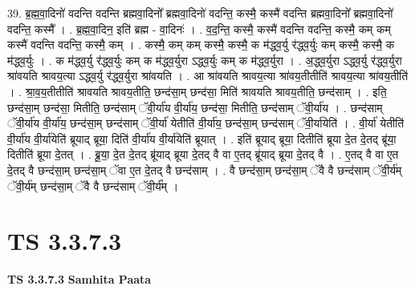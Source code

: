 \documentclass[17pt]{extarticle}
\begin{document}
39. ब्र॒ह्म॒वा॒दिनो॑ वदन्ति वदन्ति ब्रह्मवा॒दिनो᳚ ब्रह्मवा॒दिनो॑ वदन्ति॒ कस्मै॒ कस्मै॑ वदन्ति ब्रह्मवा॒दिनो᳚ ब्रह्मवा॒दिनो॑ वदन्ति॒ कस्मै᳚ । . ब्र॒ह्म॒वा॒दिन॒ इति॑ ब्रह्म - वा॒दिनः॑ । . व॒द॒न्ति॒ कस्मै॒ कस्मै॑ वदन्ति वदन्ति॒ कस्मै॒ कम् कम् कस्मै॑ वदन्ति वदन्ति॒ कस्मै॒ कम् । . कस्मै॒ कम् कम् कस्मै॒ कस्मै॒ क म॑द्ध्व॒र्यु र॑द्ध्व॒र्युः कम् कस्मै॒ कस्मै॒ क म॑द्ध्व॒र्युः । . क म॑द्ध्व॒र्यु र॑द्ध्व॒र्युः कम् क म॑द्ध्व॒र्युरा ऽद्ध्व॒र्युः कम् क म॑द्ध्व॒र्युरा । . अ॒द्ध्व॒र्युरा ऽद्ध्व॒र्यु र॑द्ध्व॒र्युरा श्रा॑वयति श्रावय॒त्या ऽद्ध्व॒र्यु र॑द्ध्व॒र्युरा श्रा॑वयति । . आ श्रा॑वयति श्रावय॒त्या श्रा॑वय॒तीतीति॑ श्रावय॒त्या श्रा॑वय॒तीति॑ । . श्रा॒व॒य॒तीतीति॑ श्रावयति श्रावय॒तीति॒ छन्द॑सा॒म् छन्द॑सा॒ मिति॑ श्रावयति श्रावय॒तीति॒ छन्द॑साम् । . इति॒ छन्द॑सा॒म् छन्द॑सा॒ मितीति॒ छन्द॑साम् ॅवी॒र्या॑य वी॒र्या॑य॒ छन्द॑सा॒ मितीति॒ छन्द॑साम् ॅवी॒र्या॑य । . छन्द॑साम् ॅवी॒र्या॑य वी॒र्या॑य॒ छन्द॑सा॒म् छन्द॑साम् ॅवी॒र्या॑ येतीति॑ वी॒र्या॑य॒ छन्द॑सा॒म् छन्द॑साम् ॅवी॒र्या॑येति॑ । . वी॒र्या॑ येतीति॑ वी॒र्या॑य वी॒र्या॑येति॑ ब्रूयाद् ब्रूया॒ दिति॑ वी॒र्या॑य वी॒र्या॑येति॑ ब्रूयात् । . इति॑ ब्रूयाद् ब्रूया॒ दितीति॑ ब्रूया दे॒त दे॒तद् ब्रू॑या॒ दितीति॑ ब्रूया दे॒तत् । . ब्रू॒या॒ दे॒त दे॒तद् ब्रू॑याद् ब्रूया दे॒तद् वै वा ए॒तद् ब्रू॑याद् ब्रूया दे॒तद् वै । . ए॒तद् वै वा ए॒त दे॒तद् वै छन्द॑सा॒म् छन्द॑सा॒म् ॅवा ए॒त दे॒तद् वै छन्द॑साम् । . वै छन्द॑सा॒म् छन्द॑सा॒म् ॅवै वै छन्द॑साम् ॅवी॒र्य॑म् ॅवी॒र्य॑म् छन्द॑सा॒म् ॅवै वै छन्द॑साम् ॅवी॒र्य᳚म् । \newline
\pagebreak
{}

\section{ TS 3.3.7.3 }

\textbf{TS 3.3.7.3 } \newline
\textbf{Samhita Paata} \newline
\end{document}
